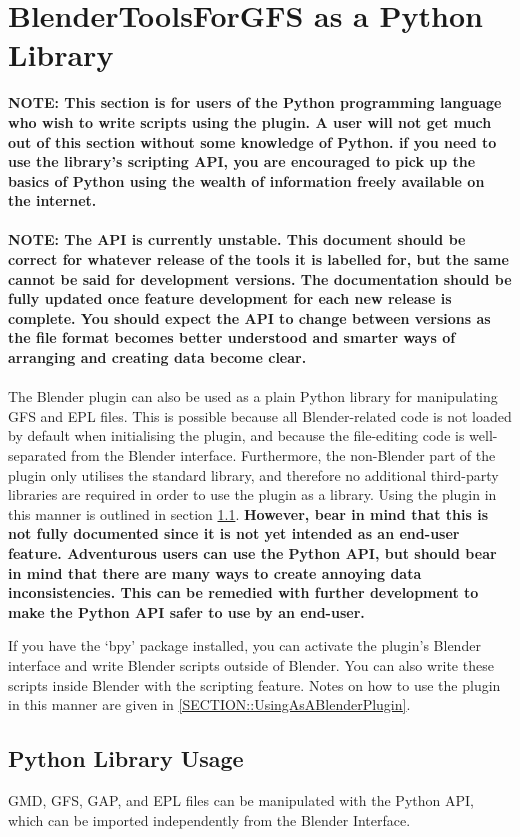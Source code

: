\documentclass{article}
\begin{document}
\clearpage

\section{BlenderToolsForGFS as a Python Library}
\label{SECTION::PythonLibrary}
\textbf{NOTE: This section is for users of the Python programming language who wish to write scripts using the plugin. A user will not get much out of this section without some knowledge of Python. if you need to use the library's scripting API, you are encouraged to pick up the basics of Python using the wealth of information freely available on the internet.}\\\\
\noindent
\textbf{NOTE: The API is currently unstable. This document should be correct for whatever release of the tools it is labelled for, but the same cannot be said for development versions. The documentation should be fully updated once feature development for each new release is complete. You should expect the API to change between versions as the file format becomes better understood and smarter ways of arranging and creating data become clear.}
\\\\
\noindent
The Blender plugin can also be used as a plain Python library for manipulating GFS and EPL files. This is possible because all Blender-related code is not loaded by default when initialising the plugin, and because the file-editing code is well-separated from the Blender interface. Furthermore, the non-Blender part of the plugin only utilises the standard library, and therefore no additional third-party libraries are required in order to use the plugin as a library. Using the plugin in this manner is outlined in section \ref{SECTION::UsingAsAPythonLibrary}. \textbf{However, bear in mind that this is not fully documented since it is not yet intended as an end-user feature. Adventurous users can use the Python API, but should bear in mind that there are many ways to create annoying data inconsistencies. This can be remedied with further development to make the Python API safer to use by an end-user.}

If you have the `bpy' package installed, you can activate the plugin's Blender interface and write Blender scripts outside of Blender. You can also write these scripts inside Blender with the scripting feature. Notes on how to use the plugin in this manner are given in \ref{SECTION::UsingAsABlenderPlugin}.

\subsection{Python Library Usage}
\label{SECTION::UsingAsAPythonLibrary}
GMD, GFS, GAP, and EPL files can be manipulated with the Python API, which can be imported independently from the Blender Interface.
\end{document}
